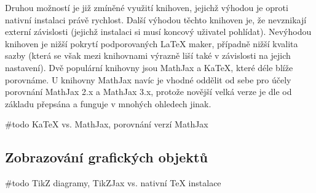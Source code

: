 Druhou možností je již zmíněné využití knihoven, jejichž výhodou je oproti nativní instalaci právě rychlost. Další
výhodou těchto knihoven je, že nevznikají externí závislosti (jejichž instalaci si musí koncový uživatel pohlídat).
Nevýhodou knihoven je nižší pokrytí podporovaných \LaTeX{} maker, případně nižší kvalita sazby (která se však mezi
knihovnami výrazně liší také v závislosti na jejich nastavení). Dvě populární knihovny jsou MathJax a KaTeX, které
déle blíže porovnáme. U knihovny MathJax navíc je vhodné oddělit od sebe pro účely porovnání MathJax 2.x a MathJax 3.x,
protože novější velká verze je dle \cite{mathjax3-docs} od základu přepsána a funguje v mnohých ohledech jinak.

\#todo KaTeX vs. MathJax, porovnání verzí MathJax

\subsection{Zobrazování grafických objektů}

\#todo TikZ diagramy, TikZJax vs. nativní TeX instalace
